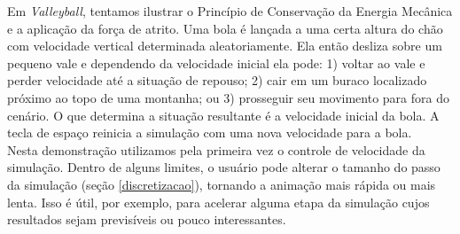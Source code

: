 Em \textit{Valleyball}, tentamos ilustrar o Princípio de Conservação da Energia Mecânica e a aplicação da força de atrito. Uma bola é lançada a uma certa altura do chão com velocidade vertical determinada aleatoriamente. Ela então desliza sobre um pequeno vale e dependendo da velocidade inicial ela pode: 1) voltar ao vale e perder velocidade até a situação de repouso; 2) cair em um buraco localizado próximo ao topo de uma montanha; ou 3) prosseguir seu movimento para fora do cenário. O que determina a situação resultante é a velocidade inicial da bola. A tecla de espaço reinicia a simulação com uma nova velocidade para a bola. \\

Nesta demonstração utilizamos pela primeira vez o controle de velocidade da simulação. Dentro de alguns limites, o usuário pode alterar o tamanho do passo da simulação (seção \ref{discretizacao}), tornando a animação mais rápida ou mais lenta. Isso é útil, por exemplo, para acelerar alguma etapa da simulação cujos resultados sejam previsíveis ou pouco interessantes. \\

